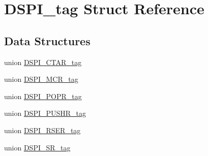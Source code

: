 \hypertarget{structDSPI__tag}{}\section{D\+S\+P\+I\+\_\+tag Struct Reference}
\label{structDSPI__tag}
\subsection*{Data Structures}
\begin{DoxyCompactItemize}
\item 
union \mbox{\hyperlink{unionDSPI__tag_1_1DSPI__CTAR__tag}{D\+S\+P\+I\+\_\+\+C\+T\+A\+R\+\_\+tag}}
\item 
union \mbox{\hyperlink{unionDSPI__tag_1_1DSPI__MCR__tag}{D\+S\+P\+I\+\_\+\+M\+C\+R\+\_\+tag}}
\item 
union \mbox{\hyperlink{unionDSPI__tag_1_1DSPI__POPR__tag}{D\+S\+P\+I\+\_\+\+P\+O\+P\+R\+\_\+tag}}
\item 
union \mbox{\hyperlink{unionDSPI__tag_1_1DSPI__PUSHR__tag}{D\+S\+P\+I\+\_\+\+P\+U\+S\+H\+R\+\_\+tag}}
\item 
union \mbox{\hyperlink{unionDSPI__tag_1_1DSPI__RSER__tag}{D\+S\+P\+I\+\_\+\+R\+S\+E\+R\+\_\+tag}}
\item 
union \mbox{\hyperlink{unionDSPI__tag_1_1DSPI__SR__tag}{D\+S\+P\+I\+\_\+\+S\+R\+\_\+tag}}
\end{DoxyCompactItemize}
